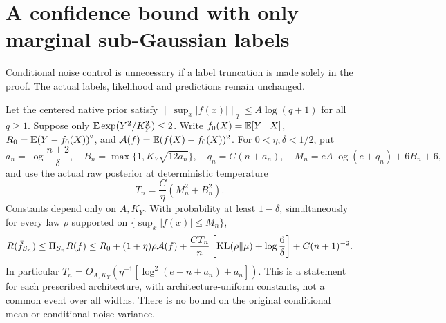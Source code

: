 \section{A confidence bound with only marginal sub-Gaussian labels}
\label{sec:asinh-marginal-high-probability}
Conditional noise control is unnecessary if a label truncation is made
solely in the proof. The actual labels, likelihood and predictions
remain unchanged.

\begin{theorem}
\label{thm:asinh-marginal-hp}
Let the centered native prior satisfy
$\|\sup_x|f(x)|\|_q\le A\log(q+1)$ for all $q\ge1$.
Suppose only $\mathbb E\exp(Y^2/K_Y^2)\le2$. Write
$f_0(X)=\mathbb E[Y\mid X]$, $R_0=\mathbb E(Y-f_0(X))^2$, and
$\mathcal A(f)=\mathbb E(f(X)-f_0(X))^2$.
For $0<\eta,\delta<1/2$, put
\[
 a_n=\log\frac{n+2}{\delta},\quad
 B_n=\max\{1,K_Y\sqrt{12a_n}\},\quad
 q_n=C(n+a_n),\quad
 M_n=eA\log(e+q_n)+6B_n+6,
\]
and use the actual raw posterior at deterministic temperature
\[
 T_n=\frac C\eta(M_n^2+B_n^2).
\]
Constants depend only on $A,K_Y$. With probability at least
$1-\delta$, simultaneously for every law $\rho$ supported on
$\{\sup_x|f(x)|\le M_n\}$,
\begin{equation}
 R(\bar f_{S_n})\le\Pi_{S_n}R(f)
 \le R_0+(1+\eta)\rho\mathcal A(f)
     +\frac{CT_n}{n}
          \left[\operatorname{KL}(\rho\|\mu)+\log\frac6\delta\right]
     +C(n+1)^{-2}.
 \label{eq:asinh-marginal-hp}
\end{equation}
In particular
$T_n=O_{A,K_Y}(\eta^{-1}[\log^2(e+n+a_n)+a_n])$.
This is a statement for each prescribed architecture, with
architecture-uniform constants, not a common event over all widths.
There is no bound on the original conditional mean or conditional
noise variance.
\end{theorem}
